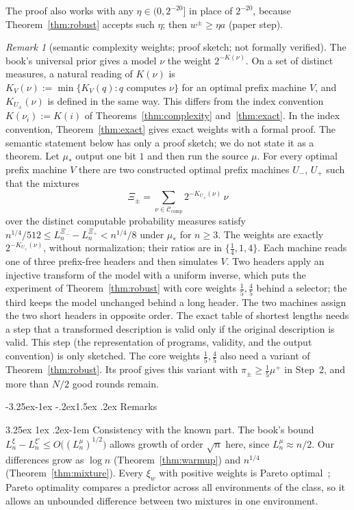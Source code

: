 \documentclass[11pt]{article}
\makeatletter
\renewcommand\subsection{\@startsection{subsection}{2}{\z@}%
  {-3.25ex\@plus -1ex \@minus -.2ex}{1.5ex \@plus .2ex}%
  {\normalfont\large\bfseries\boldmath}}
\renewcommand\paragraph{\@startsection{paragraph}{4}{\z@}%
  {3.25ex \@plus1ex \@minus.2ex}{-1em}%
  {\normalfont\normalsize\bfseries\boldmath}}
\newcommand{\cCcomp}{\mathcal{C}_{\mathrm{comp}}}
\theoremstyle{definition}
\theoremstyle{remark}
\newtheorem{remark}[theorem]{Remark}
\makeatother
\begin{document}
The proof also works with any $\eta\in(0,2^{-20}]$ in place of $2^{-20}$,
because Theorem~\ref{thm:robust} accepts such $\eta$; then $w^\pm\ge\eta a$
(paper step).

\begin{remark}[semantic complexity weights; proof sketch; not formally verified]\label{rem:exactK}
The book's universal prior gives a model $\nu$ the weight $2^{-K(\nu)}$. On a
set of distinct measures, a natural reading of $K(\nu)$ is
$K_V(\nu):=\min\{K_V(q):q\text{ computes }\nu\}$ for an optimal prefix machine
$V$, and $K_{U_\pm}(\nu)$ is defined in the same way. This differs from the
index convention $K(\nu_i):=K(i)$ of Theorems~\ref{thm:complexity}
and~\ref{thm:exact}. In the index convention, Theorem~\ref{thm:exact} gives
exact weights with a formal proof. The semantic statement below has only a
proof sketch; we do not state it as a theorem. Let
$\mu_*$ output one bit $1$ and then run the source $\mu$. For every optimal
prefix machine $V$ there are two constructed optimal prefix machines $U_-$,
$U_+$ such that the mixtures
\[
\Xi_\pm=\sum_{\nu\in\cCcomp}2^{-K_{U_\pm}(\nu)}\,\nu
\]
over the distinct computable probability measures satisfy
$n^{1/4}/512\le L_n^{\Xi_-}-L_n^{\Xi_+}<n^{1/4}/8$ under $\mu_*$ for
$n\ge3$. The weights are exactly $2^{-K_{U_\pm}(\nu)}$, without normalization;
their ratios are in $\{\frac14,1,4\}$. Each machine reads one of three
prefix-free headers and then simulates $V$. Two headers apply an injective
transform of the model with a uniform inverse, which puts the experiment of
Theorem~\ref{thm:robust} with core weights $\frac15,\frac45$ behind a selector;
the third keeps the model unchanged behind a long header. The two machines
assign the two short headers in opposite order. The exact table of shortest
lengths needs a step that a transformed description is valid only if the
original description is valid. This step (the representation of programs,
validity, and the output convention) is only sketched. The core weights $\frac15,\frac45$ also need a variant of
Theorem~\ref{thm:robust}. Its proof gives this variant with
$\pi_\pm\ge\frac15\mu^+$ in Step~2, and more than $N/2$ good rounds remain.
\end{remark}

\subsection{Remarks}

\paragraph{Consistency with the known part.}
The book's bound $L_n^{\xi}-L_n^{\xi'}\le O\bigl((L_n^{\mu})^{1/2}\bigr)$ allows growth of
order $\sqrt n$ here, since $L_n^\mu\approx n/2$. Our differences grow as
$\log n$ (Theorem~\ref{thm:warmup}) and $n^{1/4}$
(Theorem~\ref{thm:mixture}). Every $\xi_w$ with positive weights is Pareto
optimal~\cite[Sec.~5.3]{hutter2003jmlr}; Pareto optimality compares a
predictor across all environments of the class, so it allows an unbounded
difference between two mixtures in one environment.
\end{document}

